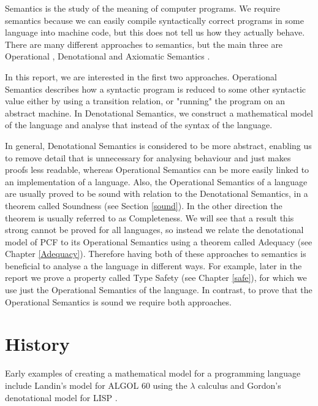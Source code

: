 Semantics is the study of the meaning of computer programs. We require semantics because we can easily compile syntactically correct programs in some  language into machine code, but this does not tell us how they actually behave. There are many different approaches to semantics, but the main three are Operational \citep{Plotkin81}, Denotational \citep{Scott93} and Axiomatic Semantics \citep{Hoare69}.

In this report, we are interested in the first two approaches. Operational Semantics describes how a syntactic program is reduced to some other syntactic value either by using a transition relation, or "running" the program on an abstract machine. In Denotational Semantics, we construct a mathematical model of the language and analyse that instead of the syntax of the language.

In general, Denotational Semantics is considered to be more abstract, enabling us to remove detail that is unnecessary for analysing behaviour and just makes proofs less readable,  whereas Operational Semantics can be more easily linked to an implementation of a language. Also, the Operational Semantics of a language are usually proved to be sound with relation to the Denotational Semantics, in a theorem called Soundness (see Section \ref{sound}). In the other direction the theorem is usually referred to as Completeness. We will see that a result this strong cannot be proved for all languages, so instead we relate the denotational model of PCF to its Operational Semantics using a theorem called Adequacy (see Chapter \ref{Adequacy}). Therefore having both of these approaches to semantics is beneficial to analyse a the language in different ways. For example, later in the report we prove a property called Type Safety (see Chapter \ref{safe}), for which we use just the Operational Semantics of the language. In contrast, to prove that the Operational Semantics is sound we require both approaches.

\section{History}
Early examples of creating a mathematical model for a programming language include Landin's model for ALGOL 60 using the $\lambda$ calculus \citep{Landin64,Landin65}
and Gordon's denotational model for LISP \citep{Gordon73}.


